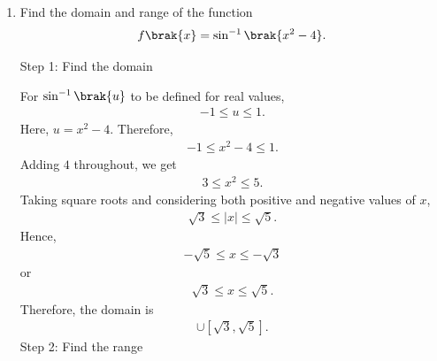 \begin{enumerate}[label=\thesubsection.\arabic*, ref=\thesubsection.\theenumi]
\solution
We know that
\begin{align}
\tan^{-1}\left(-\frac{1}{\sqrt{3}}\right)
=-\frac{\pi}{6}.
\end{align}
Also, using the principal value of the inverse cotangent,
\begin{align}
\cot^{-1}\left(\frac{1}{\sqrt{3}}\right)
=\frac{\pi}{3}.
\end{align}
Since
\begin{align}
\sin\left(-\frac{\pi}{2}\right)=-1,
\end{align}
we have
\begin{align}
\tan^{-1}\sbrak{\sin\brak{-\frac{\pi}{2}}}
=\tan^{-1}\brak{-1}
=-\frac{\pi}{4}.
\end{align}
Substituting these values in \eqref{eq:EE26BTECH11211_Prob_21.1}, the given expression becomes
\begin{align}
 = -\frac{\pi}{6}+\frac{\pi}{3}-\frac{\pi}{4}.
\end{align}
Taking the LCM of $6$, $3$, and $4$, we obtain
\begin{align}
&-\frac{2\pi}{12}+\frac{4\pi}{12}-\frac{3\pi}{12}\\[4pt]
&=\frac{\brak{-2+4-3}\pi}{12}\\[4pt]
&=-\frac{\pi}{12}.
\end{align}

\item
Find the domain and range of the function
\begin{align}
f\brak{x}=\sin^{-1}\brak{x^2-4}.
\end{align}

\solution
{Step 1: Find the domain}

For $\sin^{-1}\brak{u}$ to be defined for real values,
\begin{align}
-1\leq u\leq 1.
\end{align}
Here, $u=x^2-4$. Therefore,
\begin{align}
-1\leq x^2-4\leq 1.
\end{align}
Adding $4$ throughout, we get
\begin{align}
3\leq x^2\leq 5.
\end{align}
Taking square roots and considering both positive
and negative values of $x$,
\begin{align}
\sqrt{3}\leq |x|\leq\sqrt{5}.
\end{align}
Hence,
\begin{align}
-\sqrt{5}\leq x\leq-\sqrt{3}
\end{align}
or
\begin{align}
\sqrt{3}\leq x\leq\sqrt{5}.
\end{align}
Therefore, the domain is
\begin{align}
[-\sqrt{5},-\sqrt{3}]
\cup[\sqrt{3},\sqrt{5}].
\end{align}
{Step 2: Find the range}


\end{enumerate}
